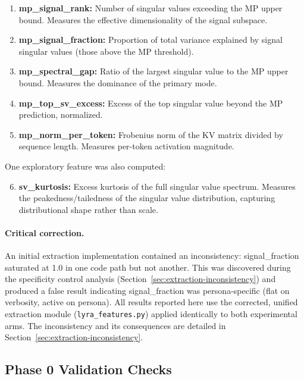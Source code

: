 \documentclass[11pt]{article}
\begin{document}
\begin{enumerate}
  \item \textbf{mp\_signal\_rank:} Number of singular values exceeding the MP upper bound. Measures the effective dimensionality of the signal subspace.
  \item \textbf{mp\_signal\_fraction:} Proportion of total variance explained by signal singular values (those above the MP threshold).
  \item \textbf{mp\_spectral\_gap:} Ratio of the largest singular value to the MP upper bound. Measures the dominance of the primary mode.
  \item \textbf{mp\_top\_sv\_excess:} Excess of the top singular value beyond the MP prediction, normalized.
  \item \textbf{mp\_norm\_per\_token:} Frobenius norm of the KV matrix divided by sequence length. Measures per-token activation magnitude.
\end{enumerate}

One exploratory feature was also computed:

\begin{enumerate}
  \setcounter{enumi}{5}
  \item \textbf{sv\_kurtosis:} Excess kurtosis of the full singular value spectrum. Measures the peakedness/tailedness of the singular value distribution, capturing distributional shape rather than scale.
\end{enumerate}

\paragraph{Critical correction.} An initial extraction implementation contained an inconsistency: signal\_fraction saturated at 1.0 in one code path but not another. This was discovered during the specificity control analysis (Section~\ref{sec:extraction-inconsistency}) and produced a false result indicating signal\_fraction was persona-specific (flat on verbosity, active on persona). All results reported here use the corrected, unified extraction module (\texttt{lyra\_features.py}) applied identically to both experimental arms. The inconsistency and its consequences are detailed in Section~\ref{sec:extraction-inconsistency}.

\subsection{Phase 0 Validation Checks}
\label{sec:phase0}
\end{document}
